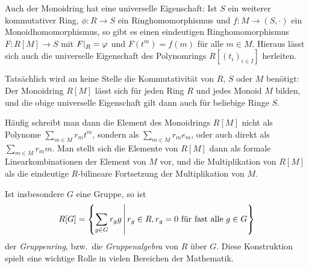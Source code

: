 Auch der Monoidring hat eine universelle Eigenschaft:
Ist $S$ ein weiterer kommutativer Ring, $\phi \colon R \to S$ ein Ringhomomorphismus und $f \colon M \to (S, \cdot)$ ein Monoidhomomorphismus, so gibt es einen eindeutigen Ringhomomorphismus $F \colon R[M] \to S$ mit $\restrict{F}{R} = \varphi$ und $F(t^m) = f(m)$ für alle $m \in M$.
Hieraus lässt sich auch die universelle Eigenschaft des Polynomrings $R[(t_i)_{i \in I}]$ herleiten.

\begin{remark}
  Tatsächlich wird an keine Stelle die Kommutativität von $R$, $S$ oder $M$ benötigt:
  Der Monoidring $R[M]$ lässt sich für jeden Ring $R$ und jedes Monoid $M$ bilden, und die obige universelle Eigenschaft gilt dann auch für beliebige Ringe $S$.
  
  Häufig schreibt man dann die Element des Monoidrings $R[M]$ nicht als Polynome $\sum_{m \in M} r_m t^m$, sondern als $\sum_{m \in M} r_m e_m$, oder auch direkt als $\sum_{m \in M} r_m m$.
  Man stellt sich die Elemente von $R[M]$ dann als formale Linearkombinationen der Element von $M$ vor, und die Multiplikation von $R[M]$ als die eindeutige $R$-bilineare Fortsetzung der Multiplikation von $M$.
  
  Ist insbesondere $G$ eine Gruppe, so ist
  \[
      R[G]
    = \left\{
        \sum_{g \in G} r_g g
      \suchthat*
        r_g \in R,
        \text{$r_g = 0$ für fast alle $g \in G$}
      \right\}
  \]
  der \emph{Gruppenring}, bzw.\ die \emph{Gruppenalgebra} von $R$ über $G$.
  Diese Konstruktion spielt eine wichtige Rolle in vielen Bereichen der Mathematik.
\end{remark}






